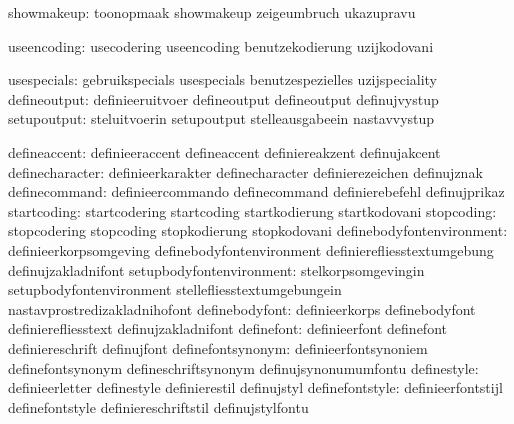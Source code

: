                    showmakeup:  toonopmaak                   showmakeup
                                zeigeumbruch                 ukazupravu

                  useencoding:  usecodering                  useencoding
                                benutzekodierung             uzijkodovani

                  usespecials:  gebruikspecials              usespecials
                                benutzespezielles            uzijspeciality
                 defineoutput:  definieeruitvoer             defineoutput
                                defineoutput                 definujvystup
                  setupoutput:  steluitvoerin                setupoutput
                                stelleausgabeein             nastavvystup

                 defineaccent:  definieeraccent              defineaccent
                                definiereakzent              definujakcent
              definecharacter:  definieerkarakter            definecharacter
                                definierezeichen             definujznak
                definecommand:  definieercommando            definecommand
                                definierebefehl              definujprikaz
                  startcoding:  startcodering                startcoding
                                startkodierung               startkodovani
                   stopcoding:  stopcodering                 stopcoding
                                stopkodierung                stopkodovani
    definebodyfontenvironment:  definieerkorpsomgeving       definebodyfontenvironment
                                definierefliesstextumgebung  definujzakladnifont
     setupbodyfontenvironment:  stelkorpsomgevingin          setupbodyfontenvironment
                                stellefliesstextumgebungein  nastavprostredizakladnihofont
               definebodyfont:  definieerkorps               definebodyfont
                                definierefliesstext          definujzakladnifont
                   definefont:  definieerfont                definefont
                                definiereschrift             definujfont
            definefontsynonym:  definieerfontsynoniem        definefontsynonym
                                defineschriftsynonym         definujsynonumumfontu
                  definestyle:  definieerletter              definestyle
                                definierestil                definujstyl
              definefontstyle:  definieerfontstijl           definefontstyle
                                definiereschriftstil         definujstylfontu


